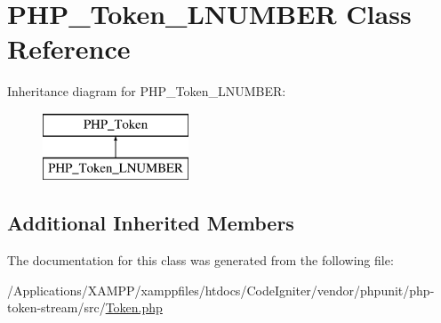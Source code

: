\hypertarget{class_p_h_p___token___l_n_u_m_b_e_r}{}\section{P\+H\+P\+\_\+\+Token\+\_\+\+L\+N\+U\+M\+B\+ER Class Reference}
\label{class_p_h_p___token___l_n_u_m_b_e_r}
Inheritance diagram for P\+H\+P\+\_\+\+Token\+\_\+\+L\+N\+U\+M\+B\+ER\+:\begin{figure}[H]
\begin{center}
\leavevmode
\includegraphics[height=2.000000cm]{class_p_h_p___token___l_n_u_m_b_e_r}
\end{center}
\end{figure}
\subsection*{Additional Inherited Members}


The documentation for this class was generated from the following file\+:\begin{DoxyCompactItemize}
\item 
/\+Applications/\+X\+A\+M\+P\+P/xamppfiles/htdocs/\+Code\+Igniter/vendor/phpunit/php-\/token-\/stream/src/\mbox{\hyperlink{_token_8php}{Token.\+php}}\end{DoxyCompactItemize}
